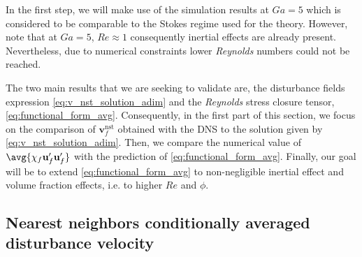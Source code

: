 In the first step, we will make use of the simulation results at $Ga = 5$ which is considered to be comparable to the Stokes regime used for the theory. 
However, note that at $Ga = 5$, $Re \approx 1$ consequently inertial effects are already present. 
Nevertheless, due to numerical constraints lower \textit{Reynolds} numbers could not be reached. 

The two main results that we are seeking to validate are, the disturbance fields expression \eqref{eq:v_nst_solution_adim} and the \textit{Reynolds} stress closure tensor, \eqref{eq:functional_form_avg}. 
Consequently, in the first part of this section, we focus on the comparison of $\textbf{v}_f^\text{nst}$ obtained with the DNS to the solution given by \ref{eq:v_nst_solution_adim}.
Then, we compare the numerical value of $\avg{\chi_f \textbf{u}_f'\textbf{u}_f'}$ with the prediction of \ref{eq:functional_form_avg}. 
Finally, our goal will be to extend \ref{eq:functional_form_avg} to non-negligible inertial effect and volume fraction effects, i.e. to higher $Re$ and $\phi$. 

\subsection{Nearest neighbors conditionally averaged disturbance velocity}


